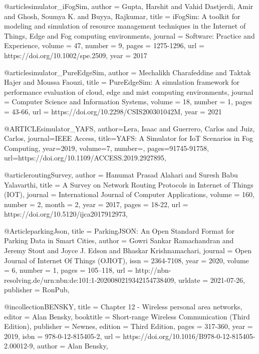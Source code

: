 \documentclass[english,version-2019-11]{uzl-thesis}
\begin{document}
\begin{bibtex-entries}
@article{simulator_iFogSim,
    author = {Gupta, Harshit and Vahid Dastjerdi, Amir and Ghosh, Soumya K. and Buyya, Rajkumar},
    title = {iFogSim: A toolkit for modeling and simulation of resource management techniques in the Internet of Things, Edge and Fog computing environments},
    journal = {Software: Practice and Experience},
    volume = {47},
    number = {9},
    pages = {1275-1296},
    url = {https://doi.org/10.1002/spe.2509},
    year = {2017}
}

@article{simulator_PureEdgeSim,
    author = {Mechalikh Charafeddine and Taktak Hajer and Moussa Faouzi},
    title = {PureEdgeSim: A simulation framework for performance evaluation of cloud, edge and mist computing environments},
    journal = {Computer Science and Information Systems},
    volume = {18},
    number = {1},
    pages = {43-66},
    url = {https://doi.org/10.2298/CSIS200301042M},
    year = {2021}
}

@ARTICLE{simulator_YAFS,
  author={Lera, Isaac and Guerrero, Carlos and Juiz, Carlos},
  journal={IEEE Access}, 
  title={YAFS: A Simulator for IoT Scenarios in Fog Computing}, 
  year={2019},
  volume={7},
  number={},
  pages={91745-91758},
  url={https://doi.org/10.1109/ACCESS.2019.2927895},
}

@article{routingSurvey,
	author = {Hanumat Prasad Alahari and Suresh Babu Yalavarthi},
	title = {A Survey on Network Routing Protocols in Internet of Things (IOT)},
	journal = {International Journal of Computer Applications},
	volume = {160},
	number = {2},
	month = {2},
	year = {2017},
	pages = {18-22},
	url = {https://doi.org/10.5120/ijca2017912973},
}

    @Article{parkingJson,
        title     = {ParkingJSON: An Open Standard Format for Parking Data in Smart Cities},
        author    = {Gowri Sankar Ramachandran and
                     Jeremy Stout and
                     Joyce J. Edson and
                     Bhaskar Krishnamachari},
        journal   = {Open Journal of Internet Of Things (OJIOT)},
        issn      = {2364-7108},
        year      = {2020},
        volume    = {6},
        number    = {1},
        pages     = {105--118},
        url       = {http://nbn-resolving.de/urn:nbn:de:101:1-2020080219342154738409},
        urldate =      {2021-07-26},
        publisher = {RonPub},
    }
  

@incollection{BENSKY,
    title = {Chapter 12 - Wireless personal area networks},
    editor = {Alan Bensky},
    booktitle = {Short-range Wireless Communication (Third Edition)},
    publisher = {Newnes},
    edition = {Third Edition},
    pages = {317-360},
    year = {2019},
    isbn = {978-0-12-815405-2},
    url = {https://doi.org/10.1016/B978-0-12-815405-2.00012-9},
    author = {Alan Bensky},
}


\end{bibtex-entries}
\end{document}

